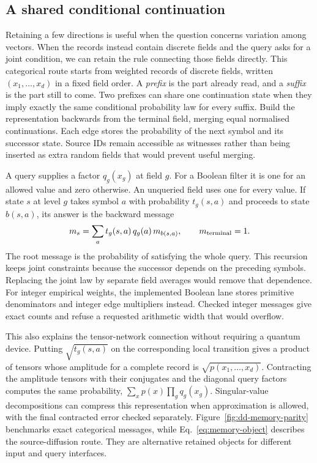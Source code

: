 \subsection{A shared conditional continuation}
Retaining a few directions is useful when the question concerns variation among vectors. When the records instead contain discrete fields and the query asks for a joint condition, we can retain the rule connecting those fields directly. This categorical route starts from weighted records of discrete fields, written $(x_1,\ldots,x_d)$ in a fixed field order. A \emph{prefix} is the part already read, and a \emph{suffix} is the part still to come. Two prefixes can share one continuation state when they imply exactly the same conditional probability law for every suffix. Build the representation backwards from the terminal field, merging equal normalised continuations. Each edge stores the probability of the next symbol and its successor state. Source IDs remain accessible as witnesses rather than being inserted as extra random fields that would prevent useful merging.

A query supplies a factor $q_g(x_g)$ at field $g$. For a Boolean filter it is one for an allowed value and zero otherwise. An unqueried field uses one for every value. If state $s$ at level $g$ takes symbol $a$ with probability $t_g(s,a)$ and proceeds to state $b(s,a)$, its answer is the backward message
\begin{equation}
 m_s=\sum_a t_g(s,a)\,q_g(a)\,m_{b(s,a)},\qquad m_{\rm terminal}=1.
 \label{eq:memory-continuation-message}
\end{equation}
The root message is the probability of satisfying the whole query. This recursion keeps joint constraints because the successor depends on the preceding symbols. Replacing the joint law by separate field averages would remove that dependence. For integer empirical weights, the implemented Boolean lane stores primitive denominators and integer edge multipliers instead. Checked integer messages give exact counts and refuse a requested arithmetic width that would overflow.

This also explains the tensor-network connection without requiring a quantum device. Putting $\sqrt{t_g(s,a)}$ on the corresponding local transition gives a product of tensors whose amplitude for a complete record is $\sqrt{p(x_1,\ldots,x_d)}$. Contracting the amplitude tensors with their conjugates and the diagonal query factors computes the same probability, $\sum_x p(x)\prod_g q_g(x_g)$. Singular-value decompositions can compress this representation when approximation is allowed, with the final contracted error checked separately. Figure~\ref{fig:dd-memory-parity} benchmarks exact categorical messages, while Eq.~\eqref{eq:memory-object} describes the source-diffusion route. They are alternative retained objects for different input and query interfaces.~\cite{Referencea10bf0}

